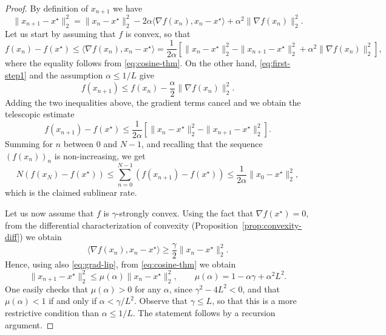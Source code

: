      \begin{proof}
         By definition of $x_{n+1}$ we have
         \begin{equation}
             \label{eq:cosine-thm}
             \|x_{n+1}-x^\star \|_2^2
             = \|x_n - x^\star\|_2^2 - 2 \alpha \langle \nabla f(x_n),x_n-x^\star \rangle  + \alpha^2 \|\nabla f(x_n)\|_2^2 .
         \end{equation}
         Let us start by assuming that $f$ is convex, so that
         \begin{equation}
             \label{eq:convexity-at-xn}
             f(x_n)-f(x^\star) \le \langle \nabla f(x_n), x_n-x^\star \rangle
             = \frac{1}{2\alpha} \left[ \|x_n - x^\star\|_2^2 - \|x_{n+1}-x^\star\|_2^2 + \alpha^2 \|\nabla f(x_n)\|_2^2  \right],
         \end{equation}
         where the equality follows from \eqref{eq:cosine-thm}.
         On the other hand, \eqref{eq:first-step1} and the assumption $\alpha\le 1/L$ give
         \begin{equation}
             f(x_{n+1}) \le f(x_n) - \frac{\alpha}2\|\nabla f(x_n)\|_2^2.
         \end{equation}
         Adding the two inequalities above, the gradient terms cancel and we obtain the telescopic estimate
         \begin{equation}
             f(x_{n+1})-f(x^\star) \le \frac{1}{2\alpha} \left[ \|x_n - x^\star\|_2^2 - \|x_{n+1}-x^\star\|_2^2 \right].
         \end{equation}
         Summing for $n$ between $0$ and $N-1$, and recalling that the sequence $(f(x_n))_n$ is non-increasing, we get
         \begin{equation}
             N\left( f(x_N)-f(x^\star) \right)
             \le \sum_{n=0}^{N-1}\left( f(x_{n+1})-f(x^\star) \right)
             \le \frac{1}{2\alpha}\|x_0 - x^\star\|_2^2,
         \end{equation}
         which is the claimed sublinear rate.

         Let us now assume that $f$ is $\gamma$-strongly convex. Using the fact that $\nabla f(x^\star)=0$, from the differential characterization of convexity (Proposition~\ref{prop:convexity-diff}) we obtain
         \begin{equation}
             \langle\nabla f(x_n),x_n-x^\star\rangle \ge \frac\gamma2\|x_n-x^\star\|_2^2.
         \end{equation}
         Hence, using also \eqref{eq:grad-lip}, from \eqref{eq:cosine-thm} we obtain
         \begin{equation}
             \|x_{n+1}-x^\star \|_2^2 \le \mu(\alpha)\|x_n - x^\star\|_2^2, \qquad \mu(\alpha) = 1 - \alpha \gamma + \alpha^2 L^2  .
         \end{equation}
         One easily checks that $\mu(\alpha)>0$ for any $\alpha$, since $\gamma^2-4L^2<0$, and that $\mu(\alpha)<1$ if and only if $\alpha < \gamma/L^2$. Observe that $\gamma\le L$, so that this is a more restrictive condition than $\alpha\le 1/L$. The statement follows by a recursion argument.
     \end{proof}
 
